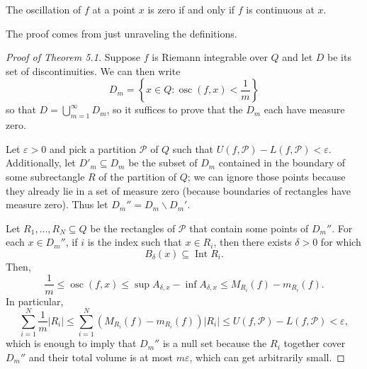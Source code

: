 \documentclass[10pt]{scrartcl}
\providecommand{\eps}{\varepsilon}
\providecommand{\opname}{\operatorname}
\providecommand{\setdiff}{\smallsetminus}
\begin{document}
\begin{lemma}
	The oscillation of $f$ at a point $x$ is zero if and only if
	$f$ is continuous at $x$.
\end{lemma}
The proof comes from just unraveling the definitions.

\begin{proof}[Proof of Theorem 5.1]
	Suppose $f$ is Riemann integrable over $Q$
	and let $D$ be its set of discontinuities. We can then write
	\[D_m = \left\{x\in Q : \opname{osc}(f, x) < \frac1m\right\}\]
	so that $D = \bigcup_{m=1}^\infty D_m$, so it suffices to prove that
	the $D_m$ each have measure zero.
	
	Let $\eps > 0$ and pick a partition $\mathcal P$ of $Q$ such that
	$U(f,\mathcal P) - L(f, \mathcal P) < \eps$.
	Additionally, let $D'_m\subseteq D_m$ be the subset of $D_m$
	contained in the boundary of some subrectangle $R$ of the partition of $Q$;
	we can ignore those points because they already lie in
	a set of measure zero (because boundaries of rectangles have measure zero).
	Thus let $D_m'' = D_m\setdiff D_m'$.
	
	Let $R_1,\dots,R_N\subseteq Q$ be the rectangles of $\mathcal P$
	that contain some points of $D_m''$. For each $x\in D_m''$,
	if $i$ is the index such that $x\in R_i$, then there exists $\delta>0$
	for which
	\[B_\delta(x) \subseteq\opname{Int}R_i.\]
	Then,
	\[\frac1m\le \opname{osc}(f,x) \le \sup A_{\delta,x} - \inf A_{\delta,x}
	\le M_{R_i}(f) - m_{R_i}(f).\]
	In particular,
	\[\sum_{i=1}^N \frac{1}{m}|R_i|\le
	\sum_{i=1}^N (M_{R_i}(f) - m_{R_i}(f)) |R_i| \le
	U(f,\mathcal P) - L(f,\mathcal P) <\eps,\]
	which is enough to imply that $D_m''$ is a null set because
	the $R_i$ together cover $D_m''$ and their total volume is at most $m\eps$,
	which can get arbitrarily small.
\end{proof}
\end{document}
